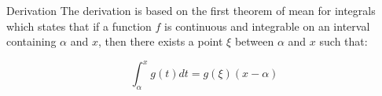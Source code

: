 \documentclass[12pt]{beamer}
\begin{document}
\begin{frame}{Derivation} 
The derivation is based on
the first theorem of mean for integrals which states that if a
function $f$ is continuous and integrable on an interval containing 
$\alpha$ and $x$, then there exists a point $\xi$ between $\alpha$
and $x$ such that: 

\begin{equation} 
\int_{\alpha}^{x} g(t)dt = g(\xi)(x-\alpha) 
\end{equation} 
\end{frame}
\end{document}

